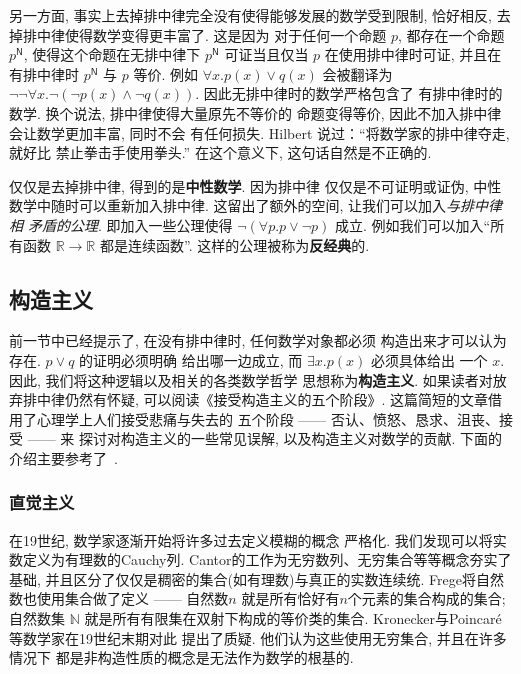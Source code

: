 \documentclass[UTF8]{ctexbook}
\newcommand{\cons}[1]{\textsf{#1}}
\theoremstyle{plain}
\theoremstyle{definition}
\theoremstyle{remark}
\begin{document}
另一方面, 事实上去掉排中律完全没有使得能够发展的数学受到限制,
恰好相反, 去掉排中律使得数学变得更丰富了. 这是因为
对于任何一个命题 \(p\), 都存在一个命题 \(p^{\cons{N}}\),
使得这个命题在无排中律下 \(p^{\cons{N}}\) 可证当且仅当
\(p\) 在使用排中律时可证, 并且在有排中律时 \(p^{\cons{N}}\)
与 \(p\) 等价. 例如 \(\forall x. p(x) \vee q(x)\)
会被翻译为 \(\neg \neg \forall x. \neg (\neg p(x) \wedge \neg q(x))\).
因此无排中律时的数学严格包含了
有排中律时的数学. 换个说法, 排中律使得大量原先不等价的
命题变得等价, 因此不加入排中律会让数学更加丰富, 同时不会
有任何损失. Hilbert 说过：“将数学家的排中律夺走, 就好比
禁止拳击手使用拳头.” 在这个意义下, 这句话自然是不正确的.

仅仅是去掉排中律, 得到的是\textbf{中性数学}. 因为排中律
仅仅是不可证明或证伪, 中性数学中随时可以重新加入排中律.
这留出了额外的空间, 让我们可以加入\emph{与排中律相
矛盾的公理}. 即加入一些公理使得 \(\neg (\forall p. p \vee \neg p)\)
成立. 例如我们可以加入“所有函数 \(\mathbb R \to \mathbb R\)
都是连续函数”. 这样的公理被称为\textbf{反经典}的.

\subsection{构造主义}

前一节中已经提示了, 在没有排中律时, 任何数学对象都必须
构造出来才可以认为存在. \(p \vee q\) 的证明必须明确
给出哪一边成立, 而 \(\exists x. p(x)\) 必须具体给出
一个 \(x\). 因此, 我们将这种逻辑以及相关的各类数学哲学
思想称为\textbf{构造主义}. 如果读者对放弃排中律仍然有怀疑,
可以阅读《接受构造主义的五个阶段》\cite{bauer:2016:fivestage}.
这篇简短的文章借用了心理学上人们接受悲痛与失去的
五个阶段 ------ 否认、愤怒、恳求、沮丧、接受 ------ 来
探讨对构造主义的一些常见误解, 以及构造主义对数学的贡献.
下面的介绍主要参考了~\cites{carl:1998:brouwer}{sep:2022:constructive}.

\subsubsection{直觉主义}

在19世纪, 数学家逐渐开始将许多过去定义模糊的概念
严格化. 我们发现可以将实数定义为有理数的Cauchy列.
Cantor的工作为无穷数列、无穷集合等等概念夯实了基础,
并且区分了仅仅是稠密的集合(如有理数)与真正的实数连续统.
Frege将自然数也使用集合做了定义 ------ 自然数\(n\)
就是所有恰好有\(n\)个元素的集合构成的集合; 自然数集
\(\mathbb N\) 就是所有有限集在双射下构成的等价类的集合.
Kronecker与Poincar\'e等数学家在19世纪末期对此
提出了质疑. 他们认为这些使用无穷集合, 并且在许多情况下
都是非构造性质的概念是无法作为数学的根基的.
\end{document}
